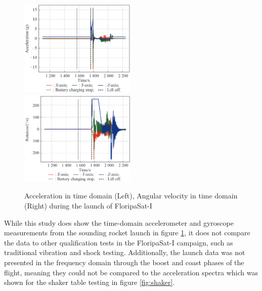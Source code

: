\documentclass[]{report}
\begin{document}
\begin{figure}[H]
  \includegraphics[width=0.495\textwidth]{images/floripa-accel.png}
  \includegraphics[width=0.495\textwidth]{images/floripa-rot.png}
  \caption{Acceleration in time domain (Left), Angular velocity in time domain (Right) during the launch of FloripaSat-I \cite{9316404}}
  \label{fig:accel-rot}
\end{figure}

While this study does show the time-domain accelerometer and gyroscope measurements from the sounding rocket launch in figure \ref{fig:accel-rot}, it does not compare the data to other qualification tests in the FloripaSat-I campaign, such as traditional vibration and shock testing. Additionally, the launch data was not presented in the frequency domain through the boost and coast phases of the flight, meaning they could not be compared to the acceleration spectra which was shown for the shaker table testing in figure \ref{fig:shaker}.
\end{document}
